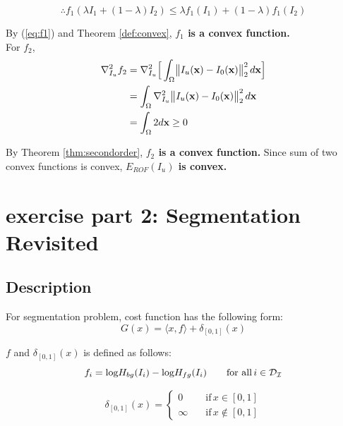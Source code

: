 \documentclass[paper=a4, fontsize=11pt]{scrartcl} %
\numberwithin{equation}{section} %
\numberwithin{figure}{section} %
\numberwithin{table}{section} %
\renewcommand{\vec}[1]{\mathbf{#1}}
\begin{document}
\begin{equation} \label{eq:f1}
	\therefore 	f_1(\lambda I_1 + (1 - \lambda) I_2) \leq \lambda f_1(I_1) + (1 - \lambda) f_1(I_2)
\end{equation}

By (\ref{eq:f1}) and Theorem \ref{def:convex}, \textbf{$f_1$ is a convex function.} \\

For $f_2$, 
\begin{align}
	\nabla_{I_u}^2 f_2 
	&= \nabla_{I_u}^2 \Big[ \int_\Omega \norm{I_u(\vec{x}) - I_0(\vec{x})}_2^2 d\vec{x} \Big] \\
	&= \int_\Omega \nabla_{I_u}^2 \norm{I_u(\vec{x}) - I_0(\vec{x})}_2^2 d\vec{x} \\
	&= \int_\Omega 2 d\vec{x} \geq 0 
\end{align}

By Theorem \ref{thm:secondorder}, \textbf{$f_2$ is a convex function.} Since sum of two convex functions is convex, \textbf{$E_{ROF}(I_u)$ is convex.}


\section{exercise part 2: Segmentation Revisited}

\subsection{Description}

\graphicspath{{results/}} 

For segmentation problem, cost function has the following form:
\begin{equation}
	G(x) = \langle x, f \rangle + \delta_{[0, 1]}(x)
\end{equation}

$f$ and $\delta_{[0, 1]}(x)$ is defined as follows:
\begin{equation}
	f_i = \text{log} H_{bg}(I_i) - \text{log} H_{fg}(I_i) \qquad \text{for all} \, i \in \mathcal{D_I} \\
\end{equation}

\begin{equation}
	\delta_{[0, 1]}(x) = 
	\begin{cases}
		0 \quad & \text{if} \, x \in [0,1] \\
		\infty \quad & \text{if} \, x \notin [0,1] 
	\end{cases}
\end{equation} \\
\end{document}
